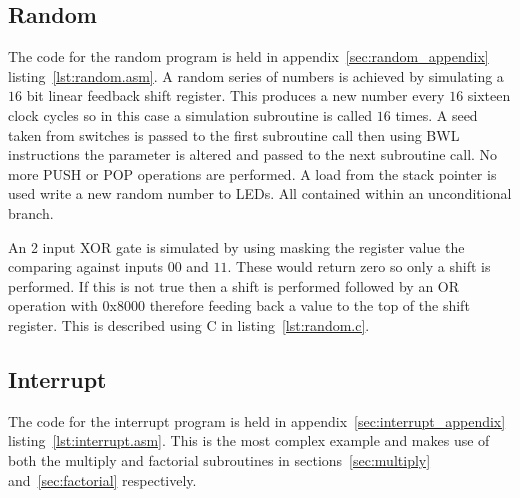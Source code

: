 






\subsection{Random}
The code for the random program is held in appendix~\ref{sec:random_appendix} listing~\ref{lst:random.asm}.
A random series of numbers is achieved by simulating a $16$ bit linear feedback shift register. 
This produces a new number every $16$ sixteen clock cycles so in this case a simulation subroutine is called $16$ times.
A seed taken from switches is passed to the first subroutine call then using BWL instructions the parameter is altered and passed to the next subroutine call.
No more PUSH or POP operations are performed.
A load from the stack pointer is used write a new random number to LEDs.
All contained within an unconditional branch.

An 2 input XOR gate is simulated by using masking the register value the comparing against inputs $00$ and $11$.
These would return zero so only a shift is performed.
If this is not true then a shift is performed followed by an OR operation with $0$x$8000$ therefore feeding back a value to the top of the shift register.
This is described using C in listing~\ref{lst:random.c}. 







\subsection{Interrupt}
The code for the interrupt program is held in appendix~\ref{sec:interrupt_appendix} listing~\ref{lst:interrupt.asm}.
This is the most complex example and makes use of both the multiply and factorial subroutines in sections~\ref{sec:multiply} and~\ref{sec:factorial} respectively.






